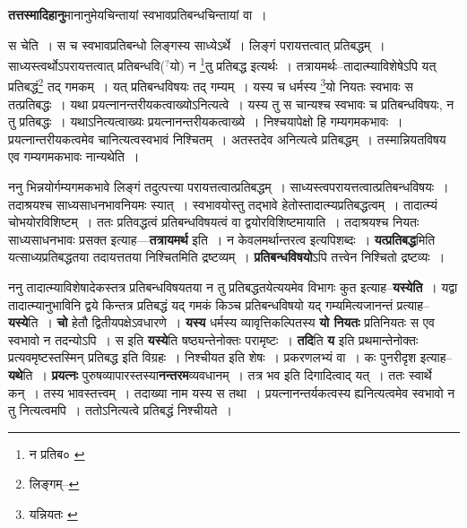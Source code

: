 \documentclass[article,12pt,a4paper]{memoir}
\newcommand{\unclear}[1]{($^{?}$#1)}
\begin{document}
	  \pstart \textbf{तत्तस्मादिहानु}मानानुमेयचिन्तायां स्वभावप्रतिबन्धचिन्तायां वा ।
	\pend
      \leavevmode{}
	  \bigskip
	  \begingroup
	

	  \pstart स चेति । स च स्वभावप्रतिबन्धो लिङ्गस्य साध्येऽर्थे । लिङ्गं परायत्तत्वात् प्रतिबद्धम् । साध्यस्त्वर्थोऽपरायत्तत्वात् प्रतिबन्धवि\unclear{यो} न \footnote{न प्रतिब० \cite{dp-msA} \cite{dp-msB} \cite{dp-msD} \cite{dp-edP} \cite{dp-edH} \cite{dp-edE} \cite{dp-edN}}तु प्रतिबद्ध इत्यर्थः । तत्रायमर्थः--तादात्म्याविशेषेऽपि यत् प्रतिबद्धं\footnote{लिङ्गम्--\cite{dp-msD-n}} तद् गमकम् । यत् प्रतिबन्धविषयः तद् गम्यम् । यस्य च धर्मस्य \footnote{यन्नियतः \cite{dp-msA} \cite{dp-msB} \cite{dp-msC} \cite{dp-msD} \cite{dp-edP} \cite{dp-edH} \cite{dp-edE} \cite{dp-edN}}यो नियतः स्वभावः स तत्प्रतिबद्धः । यथा प्रयत्नानन्तरीयकत्वाख्योऽनित्यत्वे । यस्य तु स चान्यश्च स्वभावः च प्रतिबन्धविषयः, न तु प्रतिबद्धः । यथाऽनित्यत्वाख्यः प्रयत्नानन्तरीयकत्वाख्ये । निश्चयापेक्षो हि गम्यगमकभावः । प्रयत्नान्तरीयकत्वमेव चानित्यत्वस्वभावं निश्चितम् । अतस्तदेव अनित्यत्वे प्रतिबद्धम् । तस्मान्नियतविषय एव गम्यगमकभावः नान्यथेति ।
	\pend
      
	  \endgroup
	

	  \pstart ननु भिन्नयोर्गम्यगमकभावे लिङ्गं तदुत्पत्त्या परायत्तत्वात्प्रतिबद्धम् । साध्यस्त्वपरायत्तत्वात्प्रतिबन्धविषयः । तदाश्रयश्च साध्यसाधनभावनियमः स्यात् । स्वभावयोस्तु तद्भावे हेतोस्तादात्म्यप्रतिबद्धत्वम् । तादात्म्यं चोभयोरविशिष्टम् । ततः प्रतिवद्धत्वं प्रतिबन्धविषयत्वं वा द्वयोरविशिष्टमायाति । तदाश्रयश्च नियतः साध्यसाधनभावः प्रसक्त इत्याह—\textbf{तत्रायमर्थ} इति । न केवलमर्थान्तरत्व इत्यपिशब्दः । \textbf{यत्प्रतिबद्ध}मिति यत्साध्यप्रतिबद्धतया तदायत्ततया निश्चितमिति द्रष्टव्यम् । \textbf{प्रतिबन्धविषयो}ऽपि तत्त्वेन निश्चितो द्रष्टव्यः ।
	\pend
      

	  \pstart ननु तादात्म्याविशेषादेकस्तत्र प्रतिबन्धविषयतया न तु प्रतिबद्धतयेत्ययमेव विभागः कुत इत्याह--\textbf{यस्येति} । यद्वा तादात्म्यानुभाविनि द्वये किन्तत्र प्रतिबद्धं यद् गमकं किञ्च प्रतिबन्धविषयो यद् गम्यमित्यजानन्तं प्रत्याह--\textbf{यस्ये}ति । \textbf{चो} हेतौ द्वितीयपक्षेऽवधारणे । \textbf{यस्य} धर्मस्य व्यावृत्तिकल्पितस्य \textbf{यो नियतः} प्रतिनियतः स एव स्वभावो न तदन्योऽपि । स इति \textbf{यस्ये}ति षष्ठ्यन्तेनोक्तः परामृष्टः । \textbf{तदि}ति \textbf{य} इति प्रथमान्तेनोक्तः प्रत्यवमृष्टस्तस्मिन् प्रतिबद्ध इति विग्रहः । निश्चीयत इति शेषः । प्रकरणलभ्यं वा । कः पुनरीदृश इत्याह--\textbf{यथे}ति । \textbf{प्रयत्नः} पुरुषव्यापारस्तस्या\textbf{नन्तरम}व्यवधानम् । तत्र भव इति दिगादित्वाद् यत् । ततः स्वार्थे कन् । तस्य भावस्तत्त्वम् । तदाख्या नाम यस्य स तथा । प्रयत्नानन्तर्यकत्वस्य ह्यनित्यत्वमेव स्वभावो न तु नित्यत्वमपि । ततोऽनित्यत्वे प्रतिबद्धं निश्चीयते ।
	\pend
      
\end{document}
